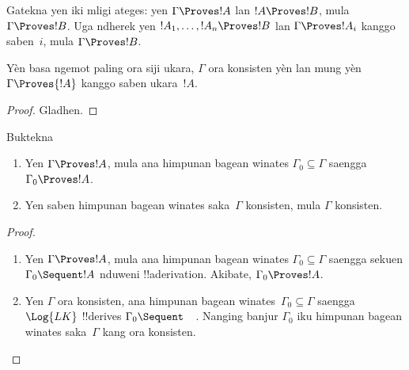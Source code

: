 \documentclass[../../../include/open-logic-section]{subfiles}
\begin{document}
Gatekna yen iki mligi ateges: yen $\Gamma \Proves !A$ lan $!A
\Proves !B$, mula $\Gamma \Proves !B$. Uga ndherek yen $!A_1,
\dots, !A_n \Proves !B$ lan $\Gamma \Proves !A_i$ kanggo saben~$i$,
mula $\Gamma \Proves !B$.

\begin{prop}
Yèn basa ngemot paling ora siji ukara, $\Gamma$ ora konsisten yèn lan mung yèn $\Gamma \Proves {!A}$ kanggo
saben ukara~$!A$.
\end{prop}

\begin{proof}
Gladhen.
\end{proof}

\begin{prob}
Buktekna 
\end{prob}

\begin{prop}[Kekompakan]
  \begin{enumerate}
  \item Yen $\Gamma \Proves !A$, mula ana himpunan bagean winates
    $\Gamma_0 \subseteq \Gamma$ saengga $\Gamma_0 \Proves !A$.
  \item Yen saben himpunan bagean winates saka~$\Gamma$ konsisten,
    mula $\Gamma$ konsisten.
  \end{enumerate}
\end{prop}

\begin{proof}
  \begin{enumerate}
    \item Yen $\Gamma \Proves !A$, mula ana himpunan bagean winates
      $\Gamma_0 \subseteq \Gamma$ saengga sekuen $\Gamma_0
      \Sequent !A$ nduweni !!a{derivation}. Akibate, $\Gamma_0
      \Proves !A$.
    \item Yen $\Gamma$ ora konsisten, ana himpunan bagean
      winates~$\Gamma_0 \subseteq \Gamma$ saengga $\Log{LK}$
      !!{derive}s $\Gamma_0 \Sequent \quad$. Nanging banjur $\Gamma_0$
      iku himpunan bagean winates saka~$\Gamma$ kang ora konsisten.
  \end{enumerate}
\end{proof}
\end{document}
